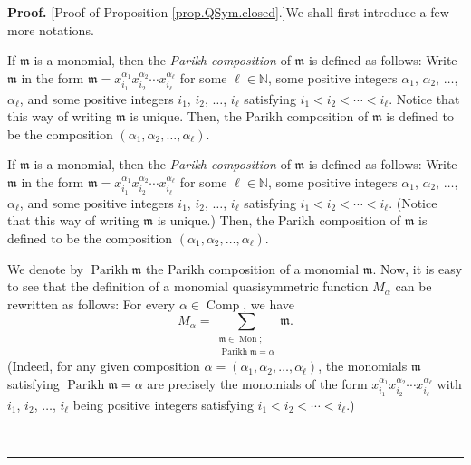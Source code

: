 \documentclass
[numbers=enddot,12pt,final,onecolumn,notitlepage,abstracton]{scrartcl}%
\theoremstyle{definition}
\newenvironment{proof}[1][Proof]{\noindent\textbf{#1.} }{\ \rule{0.5em}{0.5em}}
\newenvironment{verlong}{}{}
\newenvironment{vershort}{}{}
\let\sumnonlimits\sum
\renewcommand{\sum}{\sumnonlimits\limits}
\begin{document}
\begin{proof}
[Proof of Proposition \ref{prop.QSym.closed}.]We shall first introduce a few
more notations.

\begin{vershort}
If $\mathfrak{m}$ is a monomial, then the \textit{Parikh composition} of
$\mathfrak{m}$ is defined as follows: Write $\mathfrak{m}$ in the form
$\mathfrak{m}=x_{i_{1}}^{\alpha_{1}}x_{i_{2}}^{\alpha_{2}}\cdots x_{i_{\ell}%
}^{\alpha_{\ell}}$ for some $\ell\in\mathbb{N}$, some positive integers
$\alpha_{1}$, $\alpha_{2}$, $\ldots$, $\alpha_{\ell}$, and some positive
integers $i_{1}$, $i_{2}$, $\ldots$, $i_{\ell}$ satisfying $i_{1}<i_{2}%
<\cdots<i_{\ell}$. Notice that this way of writing $\mathfrak{m}$ is unique.
Then, the Parikh composition of $\mathfrak{m}$ is defined to be the
composition $\left(  \alpha_{1},\alpha_{2},\ldots,\alpha_{\ell}\right)  $.
\end{vershort}

\begin{verlong}
If $\mathfrak{m}$ is a monomial, then the \textit{Parikh composition} of
$\mathfrak{m}$ is defined as follows: Write $\mathfrak{m}$ in the form
$\mathfrak{m}=x_{i_{1}}^{\alpha_{1}}x_{i_{2}}^{\alpha_{2}}\cdots x_{i_{\ell}%
}^{\alpha_{\ell}}$ for some $\ell\in\mathbb{N}$, some positive integers
$\alpha_{1}$, $\alpha_{2}$, $\ldots$, $\alpha_{\ell}$, and some positive
integers $i_{1}$, $i_{2}$, $\ldots$, $i_{\ell}$ satisfying $i_{1}<i_{2}%
<\cdots<i_{\ell}$. (Notice that this way of writing $\mathfrak{m}$ is unique.)
Then, the Parikh composition of $\mathfrak{m}$ is defined to be the
composition $\left(  \alpha_{1},\alpha_{2},\ldots,\alpha_{\ell}\right)  $.
\end{verlong}

We denote by $\operatorname*{Parikh}\mathfrak{m}$ the Parikh composition of a
monomial $\mathfrak{m}$. Now, it is easy to see that the definition of a
monomial quasisymmetric function $M_{\alpha}$ can be rewritten as follows: For
every $\alpha\in\operatorname*{Comp}$, we have%
\begin{equation}
M_{\alpha}=\sum_{\substack{\mathfrak{m}\in\operatorname*{Mon}%
;\\\operatorname*{Parikh}\mathfrak{m}=\alpha}}\mathfrak{m}.
\label{pf.prop.QSym.closed.Malpha-via-Parikh}%
\end{equation}
(Indeed, for any given composition $\alpha=\left(  \alpha_{1},\alpha
_{2},\ldots,\alpha_{\ell}\right)  $, the monomials $\mathfrak{m}$ satisfying
$\operatorname*{Parikh}\mathfrak{m}=\alpha$ are precisely the monomials of the
form $x_{i_{1}}^{\alpha_{1}}x_{i_{2}}^{\alpha_{2}}\cdots x_{i_{\ell}}%
^{\alpha_{\ell}}$ with $i_{1}$, $i_{2}$, $\ldots$, $i_{\ell}$ being positive
integers satisfying $i_{1}<i_{2}<\cdots<i_{\ell}$.)


\end{proof}
\end{document}
